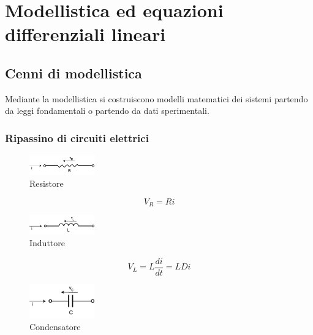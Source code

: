 \chapter{Modellistica ed equazioni differenziali lineari}



\section{Cenni di modellistica}
Mediante la modellistica si costruiscono modelli matematici dei sistemi partendo da leggi fondamentali o partendo da dati sperimentali.

\subsection{Ripassino di circuiti elettrici}

\begin{figure}[h!]
  \begin{center}
    \includegraphics[width=0.25\textwidth]{images/resistore}
  \end{center}
  \caption{Resistore}
  \label{fig:resistore}
\end{figure}

\begin{equation}
  V_R = Ri
  \label{eq:tensione_resistore}
\end{equation}

\begin{figure}[h!]
  \begin{center}
    \includegraphics[width=0.25\textwidth]{images/induttore}
  \end{center}
  \caption{Induttore}
  \label{fig:induttore}
\end{figure}

\begin{equation}
  V_L = L \displaystyle\frac{di}{dt} = LDi
  \label{eq:tensione_induttanza}
\end{equation}

\begin{figure}[h!]
  \begin{center}
    \includegraphics[width=0.25\textwidth]{images/condensatore}
  \end{center}
  \caption{Condensatore}
  \label{fig:condensatore}
\end{figure}

